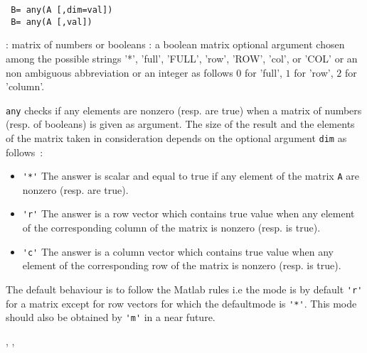 \begin{mandesc}
\end{mandesc}
\begin{calling_sequence}
\begin{verbatim}
 B= any(A [,dim=val])
 B= any(A [,val])
\end{verbatim}
\end{calling_sequence}
\begin{parameters}
  \begin{varlist}
    :  matrix of numbers or booleans 
     : a boolean matrix 
     optional argument chosen among the possible strings '*', 
    'full', 'FULL', 'row', 'ROW', 'col', or 'COL'  or an non ambiguous abbreviation or an 
    integer as follows $0$ for 'full', $1$ for 'row', $2$ for 'column'.
  \end{varlist}
\end{parameters}

\begin{mandescription}
  \verb!any! checks if any elements are nonzero (resp. are true) when a matrix of numbers (resp. of booleans) 
  is given as argument. The size of the result and the elements of the matrix taken in consideration depends 
  on the optional argument \verb!dim! as follows~:
  \begin{itemize}
  \item \verb!'*'! The answer is scalar and equal to true if any element of the matrix \verb!A!
    are nonzero (resp. are true).
  \item \verb!'r'! The answer is a row vector which contains true value when any element of 
    the corresponding column of the matrix is nonzero (resp. is true). 
  \item \verb!'c'! The answer is a column vector which contains true value when any element of 
    the corresponding row of the matrix is nonzero (resp. is true).
  \end{itemize}
  The default behaviour is to follow the Matlab rules i.e the mode is by default \verb!'r'! 
  for a matrix except for row vectors for which the defaultmode is \verb!'*'!. 
  This mode should also be obtained by \verb!'m'! in a near future. 
\end{mandescription}
\begin{manseealso}
  , , 
\end{manseealso}

